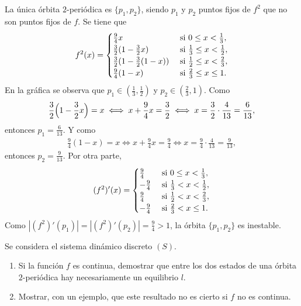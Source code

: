 \documentclass[11pt]{report}
\begin{document}
\begin{solution}
    La única órbita $2$-periódica es $\{p_1,p_2\}$, siendo $p_1$ y $p_2$ puntos fijos de $f^2$ que no son puntos fijos de $f$. Se tiene que
    \[f^2(x) = \begin{cases}
        \frac{9}{4}x & $ si $ 0 \leq x < \frac{1}{3}, \\
        \frac{3}{2}(1-\frac{3}{2}x) & $ si $ \frac{1}{3} \leq x < \frac{1}{2}, \\
        \frac{3}{2}(1-\frac{3}{2}(1-x)) & $ si $ \frac{1}{2} \leq x < \frac{2}{3}, \\
        \frac{9}{4}(1-x) & $ si $ \frac{2}{3} \leq x \leq 1. 
    \end{cases}\]
    En la gráfica se observa que $p_1 \in (\frac{1}{3},\frac{1}{2})$ y $p_2 \in (\frac{2}{3},1)$. Como
    \begin{align*}
        \frac{3}{2}\Bigl(1-\frac{3}{2}x\Bigr) = x \iff x+\frac{9}{4}x = \frac{3}{2} \iff x = \frac{3}{2}\cdot \frac{4}{13} = \frac{6}{13},
    \end{align*}
    entonces $p_1 = \frac{6}{13}$. Y como
    \begin{align*}
        \frac{9}{4}(1-x) = x \iff x+\frac{9}{4}x = \frac{9}{4} \iff x = \frac{9}{4} \cdot \frac{4}{13} = \frac{9}{13},
    \end{align*}
    entonces $p_2 = \frac{9}{13}$. Por otra parte,
    \[(f^2)'(x) = \begin{cases}
        \frac{9}{4} & $ si $ 0 \leq x < \frac{1}{3}, \\
        -\frac{9}{4} & $ si $ \frac{1}{3} < x < \frac{1}{2}, \\
        \frac{9}{4} & $ si $ \frac{1}{2} < x < \frac{2}{3}, \\
        -\frac{9}{4} & $ si $ \frac{2}{3} < x \leq 1.
    \end{cases}\]
    Como $|(f^2)'(p_1)| = |(f^2)'(p_2)| = \frac{9}{4} > 1$, la órbita $\{p_1,p_2\}$ es inestable.
\end{solution}

\begin{exercise}
    Se considera el sistema dinámico discreto $(S)$.
    \begin{enumerate}
        \item Si la función $f$ es continua, demostrar que entre los dos estados de una órbita $2$-periódica hay necesariamente un equilibrio $l$.
        \item Mostrar, con un ejemplo, que este resultado no es cierto si $f$ no es continua.
    \end{enumerate}
\end{exercise}
\end{document}
